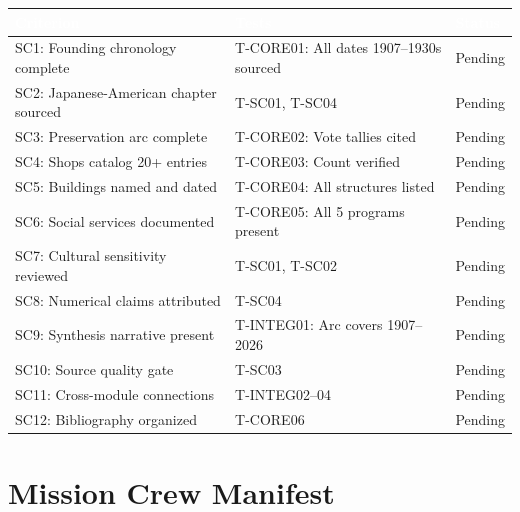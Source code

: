 \documentclass[11pt,letterpaper]{article}
\newcommand{\tableheader}[1]{\textbf{\sffamily\textcolor{white}{#1}}}
\begin{document}
\begin{center}
\begin{tabularx}{\textwidth}{C{1.5cm}L{5.5cm}X}
\toprule
{}
\tableheader{Criterion} & \tableheader{Tests} & \tableheader{Status} \\
\midrule
SC1: Founding chronology complete & T-CORE01: All dates 1907--1930s sourced & Pending \\
SC2: Japanese-American chapter sourced & T-SC01, T-SC04 & Pending \\
SC3: Preservation arc complete & T-CORE02: Vote tallies cited & Pending \\
SC4: Shops catalog 20+ entries & T-CORE03: Count verified & Pending \\
SC5: Buildings named and dated & T-CORE04: All structures listed & Pending \\
SC6: Social services documented & T-CORE05: All 5 programs present & Pending \\
SC7: Cultural sensitivity reviewed & T-SC01, T-SC02 & Pending \\
SC8: Numerical claims attributed & T-SC04 & Pending \\
SC9: Synthesis narrative present & T-INTEG01: Arc covers 1907--2026 & Pending \\
SC10: Source quality gate & T-SC03 & Pending \\
SC11: Cross-module connections & T-INTEG02--04 & Pending \\
SC12: Bibliography organized & T-CORE06 & Pending \\
\bottomrule
\end{tabularx}
\end{center}

\section{Mission Crew Manifest}
\end{document}
